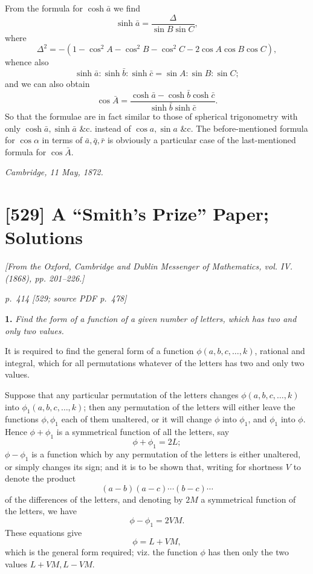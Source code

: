 \documentclass[11pt,a4paper]{article}
\newcommand{\pagemarker}[3]{\par\bigskip\noindent\textit{p.~#1 [#2; source PDF p.~#3]}\par\smallskip}
\begin{document}
From the formula for $\cosh\bar a$ we find
\[
\sinh\bar a=\frac{\Delta}{\sin B\sin C},
\]
where
\[
\Delta^2=-(1-\cos^2A-\cos^2B-\cos^2C-2\cos A\cos B\cos C),
\]
whence also
\[
\sinh\bar a:\sinh\bar b:\sinh\bar c=\sin A:\sin B:\sin C;
\]
and we can also obtain
\[
\cos\bar A=\frac{\cosh\bar a-\cosh\bar b\cosh\bar c}
{\sinh\bar b\sinh\bar c}.
\]
So that the formulae are in fact similar to those of spherical trigonometry with only
$\cosh\bar a,\sinh\bar a$ \&c. instead of $\cos a,\sin a$ \&c. The before-mentioned
formula for $\cos\alpha$ in terms of $\bar a,\bar q,\bar r$ is obviously a particular case
of the last-mentioned formula for $\cos\bar A$.

\noindent\textit{Cambridge, 11 May, 1872.}

\clearpage
\section*{[529] A ``Smith's Prize'' Paper; Solutions}
\begin{center}
\textit{[From the Oxford, Cambridge and Dublin Messenger of Mathematics, vol. IV. (1868), pp. 201--226.]}
\end{center}

\pagemarker{414}{529}{478}

\textbf{1.} \textit{Find the form of a function of a given number of letters, which has two and only two values.}

It is required to find the general form of a function
$\phi(a,b,c,\ldots,k)$, rational and integral, which for all permutations whatever of
the letters has two and only two values.

Suppose that any particular permutation of the letters changes
$\phi(a,b,c,\ldots,k)$ into $\phi_1(a,b,c,\ldots,k)$; then any permutation of the letters
will either leave the functions $\phi,\phi_1$ each of them unaltered, or it will change
$\phi$ into $\phi_1$, and $\phi_1$ into $\phi$. Hence $\phi+\phi_1$ is a symmetrical function
of all the letters, say
\[
\phi+\phi_1=2L;
\]
$\phi-\phi_1$ is a function which by any permutation of the letters is either unaltered,
or simply changes its sign; and it is to be shown that, writing for shortness $V$ to
denote the product
\[
(a-b)(a-c)\cdots(b-c)\cdots
\]
of the differences of the letters, and denoting by $2M$ a symmetrical function of the
letters, we have
\[
\phi-\phi_1=2VM.
\]
These equations give
\[
\phi=L+VM,
\]
which is the general form required; viz. the function $\phi$ has then only the two
values $L+VM,L-VM$.
\end{document}
